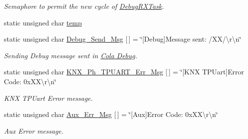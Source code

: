 \begin{DoxyCompactItemize}
\begin{DoxyCompactList}\small\item\em Semaphore to permit the new cycle of \hyperlink{group___debug___exported___functions___group2_ga8013ff117a9e96e630d30771cf9b0199}{Debug\+R\+X\+Task}. \end{DoxyCompactList}\item 
static unsigned char \hyperlink{group___debug___private___variables_gabe413cb96d839cbe31417aa52d920f21}{temp}
\item 
static unsigned char \hyperlink{group___debug___private___variables_ga8dc7f546fccea9be95d04715b6de6286}{Debug\+\_\+\+Send\+\_\+\+Msg} \mbox{[}$\,$\mbox{]} = \char`\"{}\mbox{[}Debug\mbox{]}Message sent\+: /XX/\textbackslash{}r\textbackslash{}n\char`\"{}\hypertarget{group___debug___private___variables_ga8dc7f546fccea9be95d04715b6de6286}{}\label{group___debug___private___variables_ga8dc7f546fccea9be95d04715b6de6286}

\begin{DoxyCompactList}\small\item\em Sending Debug message sent in \hyperlink{group___cola___debug}{Cola Debug}. \end{DoxyCompactList}\item 
static unsigned char \hyperlink{group___debug___private___variables_gac42157f7c2b868252acf6b58cfa30aee}{K\+N\+X\+\_\+\+Ph\+\_\+\+T\+P\+U\+A\+R\+T\+\_\+\+Err\+\_\+\+Msg} \mbox{[}$\,$\mbox{]} = \char`\"{}\mbox{[}K\+NX T\+P\+Uart\mbox{]}Error Code\+: 0x\+X\+X\textbackslash{}r\textbackslash{}n\char`\"{}\hypertarget{group___debug___private___variables_gac42157f7c2b868252acf6b58cfa30aee}{}\label{group___debug___private___variables_gac42157f7c2b868252acf6b58cfa30aee}

\begin{DoxyCompactList}\small\item\em K\+NX T\+P\+Uart Error message. \end{DoxyCompactList}\item 
static unsigned char \hyperlink{group___debug___private___variables_gab56635544aea253fe5a75ded7dda1b2f}{Aux\+\_\+\+Err\+\_\+\+Msg} \mbox{[}$\,$\mbox{]} = \char`\"{}\mbox{[}Aux\mbox{]}Error Code\+: 0x\+X\+X\textbackslash{}r\textbackslash{}n\char`\"{}\hypertarget{group___debug___private___variables_gab56635544aea253fe5a75ded7dda1b2f}{}\label{group___debug___private___variables_gab56635544aea253fe5a75ded7dda1b2f}

\begin{DoxyCompactList}\small\item\em Aux Error message. \end{DoxyCompactList}\end{DoxyCompactItemize}


